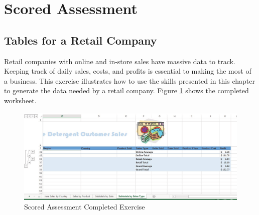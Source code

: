 \begin{enumbox}
\begin{enumerate}
	\end{enumerate}
\end{enumbox}
	
\section{Scored Assessment}

\subsection{Tables for a Retail Company}

Retail companies with online and in-store sales have massive data to track. Keeping track of daily sales, costs, and profits is essential to making the most of a business. This exercise illustrates how to use the skills presented in this chapter to generate the data needed by a retail company. Figure \ref{05:fig31} shows the completed worksheet.

\begin{figure}[H]
	\centering
	\includegraphics[width=\maxwidth{.95\linewidth}]{gfx/ch05_fig31}
	\caption{Scored Assessment Completed Exercise}
	\label{05:fig31}
\end{figure}

